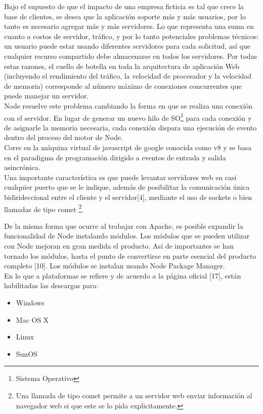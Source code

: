 Bajo el supuesto de que el impacto de una empresa ficticia es tal que crece la base de clientes, se desea 
que la aplicación soporte más y más usuarios, por lo tanto es necesario agregar más y más servidores.
Lo que representa una suma en cuanto a costos de servidor, tráfico, y por lo tanto potenciales
problemas técnicos: un usuario puede estar usando diferentes servidores para cada solicitud, así que cualquier 
recurso compartido debe almacenarse en todos los servidores. Por todas estas razones, el cuello de botella en 
toda la arquitectura de aplicación Web (incluyendo el rendimiento del tráfico, la velocidad de procesador y la 
velocidad de memoria) corresponde al número máximo de conexiones concurrentes que puede manejar un servidor.\\

Node resuelve este problema cambiando la forma en que se realiza una conexión con el servidor. En lugar de 
generar un nuevo hilo de SO\footnote{Sistema Operativo} para cada conexión y de asignarle la memoria necesaria, 
cada conexión dispara una ejecución de evento dentro del proceso del motor de Node.\\

Corre en la máquina virtual de javascript de google conocida como v8 y se basa en el paradigma
de programación dirigido a eventos de entrada y salida asincrónica.\\

Una importante característica es que puede levantar servidores web en casi cualquier puerto que se 
le indique, además de posibilitar la comunicación única bidirideccional entre el cliente y el servidor[4],
mediante el uso de sockets o bien llamadas de tipo comet \footnote{Una llamada de tipo comet 
permite a un servidor web enviar información al navegador web si que este se lo pida explicitamente.}.


De la misma forma que ocurre al trabajar con Apache, es posible expandir la funcionalidad de Node 
instalando módulos. Los módulos que se pueden utilizar con Node mejoran en gran medida el producto.
Así de importantes se han tornado los módulos, hasta el punto de convertirse en parte esencial del 
producto completo [10]. Los módulos se instalan usando Node Package Manager.\\

En lo que a plataformas se refiere y de acuerdo a la página oficial [17], están habilitadas las 
descargas para:
\begin{itemize}
 \item Windows
 \item Mac OS X
 \item Linux
 \item SunOS
\end{itemize}

